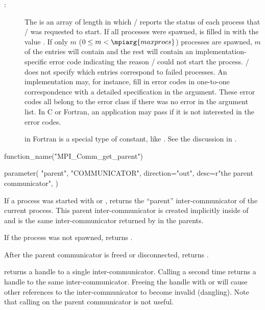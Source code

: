 \begin{description}
\item[:]
The  is an array of length 
in which \MPI/ reports the status of each process that
\MPI/ was requested to start. If all  processes were spawned,
 is filled in with the value
. If only $m$ ($0 \leq m < \mpiarg{maxprocs}$)
processes are spawned, $m$ of the entries will contain
 and the rest will contain
an implementation-specific error code indicating the
reason \MPI/ could not start the process. \MPI/ does not
specify which entries correspond to failed processes.
An implementation may, for instance, fill in
error codes in one-to-one correspondence with
a detailed specification in the 
argument. These error codes
all belong to the error class 
if there was no error in the argument list.
In C or
Fortran,
an application may pass 
if it is not interested in the error codes.
\begin{implementors}
 in Fortran is a special type
of constant, like .
See the discussion in .
\end{implementors}
\end{description}

\begin{mpi-binding}
    function_name("MPI_Comm_get_parent")

    parameter(
        "parent",
        "COMMUNICATOR",
        direction="out",
        desc=r"the parent communicator",
    )
\end{mpi-binding}

If a process was started with  or\flushline
{},
 returns the ``parent'' inter-communicator
of the current process. This parent inter-communicator is created
implicitly inside of  and is the same
inter-communicator returned by  in the parents.

If the process was not spawned, 
returns .

After the parent communicator is freed or disconnected, 
returns .

\begin{users}
 returns a handle to a single inter-communicator.
Calling  a second time returns a handle
to the same inter-communicator. Freeing the handle with 
or  will cause other references to
the inter-communicator to become invalid (dangling).
Note that calling  on the parent
communicator is not useful.
\end{users}


